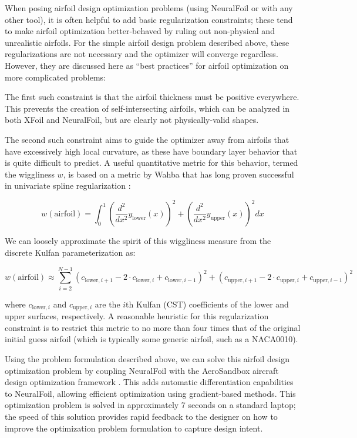 \documentclass[conf]{new-aiaa}
\begin{document}
    When posing airfoil design optimization problems (using NeuralFoil or with any other tool), it is often helpful to add basic regularization constraints; these tend to make airfoil optimization better-behaved by ruling out non-physical and unrealistic airfoils. For the simple airfoil design problem described above, these regularizations are not necessary and the optimizer will converge regardless. However, they are discussed here as ``best practices'' for airfoil optimization on more complicated problems:

    The first such constraint is that the airfoil thickness must be positive everywhere. This prevents the creation of self-intersecting airfoils, which can be analyzed in both XFoil and NeuralFoil, but are clearly not physically-valid shapes.

    The second such constraint aims to guide the optimizer away from airfoils that have excessively high local curvature, as these have boundary layer behavior that is quite difficult to predict. A useful quantitative metric for this behavior, termed the wiggliness $w$, is based on a metric by Wahba that has long proven successful in univariate spline regularization \cite{wahba_spline_2007}:

    $$w(\mathrm{airfoil}) = \int_0^1 \left( \frac{d^2}{dx^2} y_\mathrm{lower}(x) \right)^2 + \left( \frac{d^2}{dx^2} y_\mathrm{upper}(x) \right)^2 dx$$

    \noindent We can loosely approximate the spirit of this wiggliness measure from the discrete Kulfan parameterization as:

    $$w(\mathrm{airfoil}) \approx \sum_{i=2}^{N-1} \left(c_{\mathrm{lower},i+1} - 2 \cdot c_{\mathrm{lower},i} + c_{\mathrm{lower},i-1} \right)^2 + \left(c_{\mathrm{upper},i+1} - 2 \cdot c_{\mathrm{upper},i} + c_{\mathrm{upper},i-1} \right)^2$$

    \noindent where $c_{\mathrm{lower},i}$ and $c_{\mathrm{upper},i}$ are the $i$th Kulfan (CST) coefficients of the lower and upper surfaces, respectively. A reasonable heuristic for this regularization constraint is to restrict this metric to no more than four times that of the original initial guess airfoil (which is typically some generic airfoil, such as a NACA0010).

    Using the problem formulation described above, we can solve this airfoil design optimization problem by coupling NeuralFoil with the AeroSandbox aircraft design optimization framework \cite{sharpe_aerosandbox_2021}. This adds automatic differentiation capabilities to NeuralFoil, allowing efficient optimization using gradient-based methods. This optimization problem is solved in approximately 7 seconds on a standard laptop; the speed of this solution provides rapid feedback to the designer on how to improve the optimization problem formulation to capture design intent.
\end{document}
